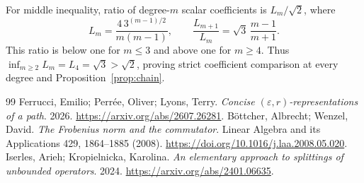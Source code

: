 \documentclass[11pt,a4paper]{article}
\begin{document}
For middle inequality, ratio of degree-\(m\) scalar coefficients is
\(L_m/\sqrt2\), where
\[
 L_m=\frac{4\,3^{(m-1)/2}}{m(m-1)},\qquad
 \frac{L_{m+1}}{L_m}=\sqrt3\,\frac{m-1}{m+1}.
\]
This ratio is below one for \(m\le3\) and above one for \(m\ge4\).
Thus \(\inf_{m\ge2}L_m=L_4=\sqrt3>\sqrt2\), proving strict coefficient
comparison at every degree and Proposition~\ref{prop:chain}.

\begin{thebibliography}{99}
Ferrucci, Emilio; Perr{\'e}e, Oliver; Lyons, Terry.
\emph{Concise $(\varepsilon, r)$-representations of a path}.
2026.
\url{https://arxiv.org/abs/2607.26281}.
B{\"o}ttcher, Albrecht; Wenzel, David.
\emph{The Frobenius norm and the commutator}.
Linear Algebra and its Applications 429, 1864--1885 (2008).
\url{https://doi.org/10.1016/j.laa.2008.05.020}.
Iserles, Arieh; Kropielnicka, Karolina.
\emph{An elementary approach to splittings of unbounded operators}.
2024.
\url{https://arxiv.org/abs/2401.06635}.
\end{thebibliography}
\end{document}
